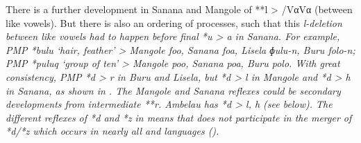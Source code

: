 There is a further development in Sanana
and Mangole of **l > {\0} /Vα{\gap}Vα (between like vowels).
But there is also an ordering of processes,
such that this \it{l}-deletion between like vowels had to happen
before final *u > \it{a} in Sanana.
For example, PMP *bulu ‘hair, feather’ > Mangole \it{foo},
Sanana \it{foa}, Lisela \it{ɸulu-n},
Buru \it{folo-n}; PMP *puluq ‘group of ten’ > Mangole \it{poo},
Sanana \it{poa}, Buru \it{polo}.
With great consistency, PMP *d > \it{r} in Buru
and Lisela, but *d > \it{l} in Mangole
and *d > \it{h} in Sanana,
as shown in .
The Mangole and Sanana reflexes could be secondary developments from intermediate **r.
Ambelau has *d > \it{l,
h} (see  below).
The different reflexes of *d
and *z in  means that 
does not participate in the merger of *d/*z which occurs in nearly
all  and 
languages ().

